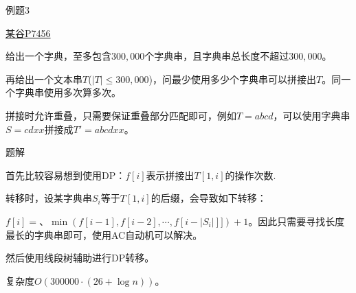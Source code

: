\documentclass{ctexbeamer}		%
\begin{document}
\begin{frame}{例题3}
    
\begin{block}{\href{https://www.luogu.com.cn/problem/P7456}{某谷P7456}}

给出一个字典，至多包含$300,000$个字典串，且字典串总长度不超过$300, 000$。

再给出一个文本串$T$($|T| \leq 300, 000$)，问最少使用多少个字典串可以拼接出$T$。同一个字典串使用多次算多次。

拼接时允许重叠，只需要保证重叠部分匹配即可，例如$T = abcd$，可以使用字典串$S = cdxx$拼接成$T' = abcdxx$。

\end{block}

\pause

\begin{block}{题解}

首先比较容易想到使用DP：$f[i]$表示拼接出$T[1, i]$的操作次数.

\pause

转移时，设某字典串$S_i$等于$T[1, i]$的后缀，会导致如下转移：

\pause

$f[i] = 、\min(f[i-1], f[i-2], \cdots, f[i - |S_i|]]) + 1$。因此只需要寻找长度最长的字典串即可，使用AC自动机可以解决。

\pause

然后使用线段树辅助进行DP转移。

复杂度$O(300000 \cdot (26 + \log{n}))$。

\end{block}

\end{frame}
\end{document}
